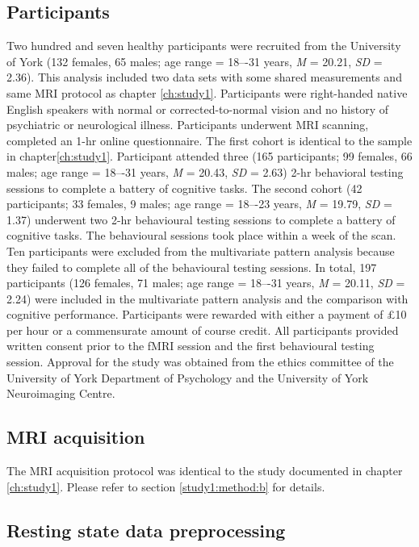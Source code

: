 \subsection{Participants}
\label{study3:method:a}
Two hundred and seven healthy participants were recruited from the University of York (132 females, 65 males; age range = 18–-31 years, \textit{M} = 20.21, \textit{SD} = 2.36). 
This analysis included two data sets with some shared measurements and same MRI protocol as chapter \ref{ch:study1}. 
Participants were right-handed native English speakers with normal or corrected-to-normal vision and no history of psychiatric or neurological illness. Participants underwent MRI scanning, completed an 1-hr online questionnaire. The first cohort is identical to the sample in chapter\ref{ch:study1}. Participant attended three 
(165 participants; 99 females, 66 males; age range = 18–-31 years, \textit{M} = 20.43, \textit{SD} = 2.63) 2-hr behavioral testing sessions to complete a battery of cognitive tasks. 
The second cohort (42 participants; 33 females, 9 males; age range = 18–-23 years, \textit{M} = 19.79, \textit{SD} = 1.37) underwent two 2-hr behavioural testing sessions to complete a battery of cognitive tasks. The behavioural sessions took place within a week of the scan. Ten participants were excluded from the multivariate pattern analysis because they failed to complete all of the behavioural testing sessions. In total, 197 participants (126 females, 71 males; age range = 18–-31 years, \textit{M} = 20.11, \textit{SD} = 2.24) were included in the multivariate pattern analysis and the comparison with cognitive performance. Participants were rewarded with either a payment of \pounds 10 per hour or a commensurate amount of course credit. All participants provided written consent prior to the fMRI session and the first behavioural testing session. Approval for the study was obtained from the ethics committee of the University of York Department of Psychology and the University of York Neuroimaging Centre.

\subsection{MRI acquisition}
\label{study3:method:b}
The MRI acquisition protocol was identical to the study documented in chapter \ref{ch:study1}. Please refer to section \ref{study1:method:b} for details.

\subsection{Resting state data preprocessing}
\label{study3:method:c}

